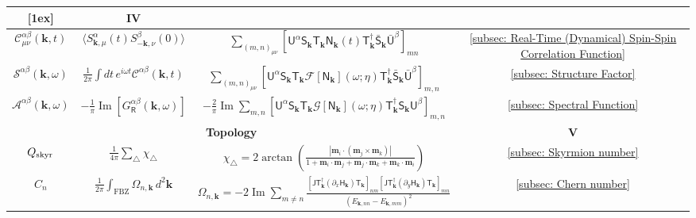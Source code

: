 \begin{table}[!h]
\begin{tabular}{c|c|c|c}
    [1ex]
    \hline
    \multicolumn{3}{c|}{\bf Correlations} & \textbf{IV} \\[0.5ex]
    \hline
    $\mathcal{C}^{\alpha \beta}_{\mu\nu}(\mathbf{k}, t)$ 
    & 
    $\langle S_{\mathbf{k},\mu}^\alpha(t) S_{-\mathbf{k},\nu}^\beta(0) \rangle$ 
    & $\sum_{(m, n)_{\mu\nu}}
    [\mathsf{U}^\alpha \mathsf{S}_{\mathbf{k}} \mathsf{T}_{\mathbf{k}} \mathsf{N}_{\mathbf{k}}(t) \mathsf{T}_{\mathbf{k}}^\dagger \bar{\mathsf{S}}_{\mathbf{k}} \bar{\mathsf{U}}^{\beta}]_{m n}$ 
    & \ref{subsec: Real-Time (Dynamical) Spin-Spin Correlation Function} \\[1ex]
    $\mathcal{S}^{\alpha \beta}(\mathbf{k},\omega)$ 
    & $\frac{1}{2 \pi} \int dt \, e^{i \omega t} \mathcal{C}^{\alpha \beta}(\mathbf{k}, t)$ 
    & $\sum_{(m, n)_{\mu\nu}} [ \mathsf{U}^\alpha \mathsf{S}_{\mathbf{k}} \mathsf{T}_{\mathbf{k}} \mathcal{F}[\mathsf{N}_{\mathbf{k}}](\omega; \eta) \mathsf{T}_{\mathbf{k}}^\dagger \bar{\mathsf{S}}_{\mathbf{k}} \bar{\mathsf{U}}^{\beta}]_{m, n}$ 
    & \ref{subsec: Structure Factor} \\[1ex]
    $\mathcal{A}^{\alpha \beta}(\mathbf{k}, \omega)$ 
    & $-\frac{1}{\pi} \operatorname{Im} [G_{\mathsf{R}}^{\alpha \beta}(\mathbf{k}, \omega)]$ & $-\frac{2}{\pi} \operatorname{Im} \sum_{m, n} [\mathsf{U}^\alpha \mathsf{S}_{\mathbf{k}} \mathsf{T}_{\mathbf{k}} \mathcal{G}[\mathsf{N}_{\mathbf{k}}] (\omega; \eta)
    \mathsf{T}_{\mathbf{k}}^\dagger \mathsf{S}_{\mathbf{k}} \mathsf{U}^\beta]_{m, n}$ & \ref{subsec: Spectral Function} \\
    \hline
    \multicolumn{3}{c|}{\bf Topology} & \textbf{V} \\[0.5ex]
    \hline
    $Q_{\rm skyr}$ 
    & $\frac{1}{4\pi} \sum_{\triangle} \chi_{\triangle}$ 
    & $\chi_{\triangle} = 2 \arctan \left( \frac{|\mathbf{m}_i \cdot (\mathbf{m}_j \times \mathbf{m}_k)|}{1 + \mathbf{m}_i \cdot \mathbf{m}_j + \mathbf{m}_j \cdot \mathbf{m}_k + \mathbf{m}_k \cdot \mathbf{m}_i} \right)$
    & \ref{subsec: Skyrmion number}
    \\
    $C_n$ & $\frac{1}{2 \pi} \int_{\mathrm{FBZ}} \Omega_{n, \mathbf{k}} \, d^2 \mathbf{k}$ 
    & $\Omega_{n, \mathbf{k}} = -2 \operatorname{Im} \sum_{m \neq n} \frac{[\mathsf{J} \mathsf{T}_{\mathbf{k}}^\dagger (\partial_x \mathsf{H}_{\mathbf{k}}) \mathsf{T}_{\mathbf{k}}]_{nm} [\mathsf{J} \mathsf{T}_{\mathbf{k}}^\dagger (\partial_y \mathsf{H}_{\mathbf{k}}) \mathsf{T}_{\mathbf{k}}]_{mn}}{(E_{\mathbf{k}, nn} - E_{\mathbf{k}, mm})^2}$ 
    & \ref{subsec: Chern number} \\[1ex]

\end{tabular}
\end{table}
